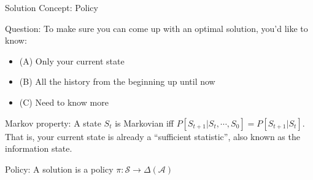 \documentclass{beamer}
\begin{document}
\begin{frame}{Solution Concept: Policy}
    \begin{exampleblock}{Question:}
        To make sure you can come up with an optimal solution, you'd like to know:
        \begin{itemize}
            \item (A) Only your current state

            \item (B) All the history from the beginning up until now

            \item (C) Need to know more
        \end{itemize}
    \end{exampleblock}

    \pause
    \begin{exampleblock}{Markov property:}
        A state $S_t$ is Markovian iff $P[S_{t+1}| S_{t}, \cdots, S_0] = P[S_{t+1}| S_{t}]$.
        That is, your current state is already a ``sufficient statistic'',
        also known as the \alert{information state}.
    \end{exampleblock}

    \pause
    \begin{exampleblock}{Policy:}
        A solution is a policy $\pi: \mathcal{S} \rightarrow \Delta(\mathcal{A})$ 
    \end{exampleblock}

\end{frame}
\end{document}
